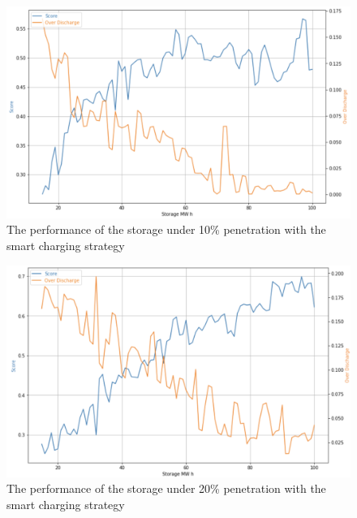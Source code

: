 \documentclass[12pt,a4paper]{report}
\begin{document}
            \begin{figure}[ht]
                \centerline{\includegraphics[scale=0.9]{simu_score_smart_10}}
                \caption{The performance of the storage under 10\% penetration with the smart charging strategy}
                \label{fig_simu_score_smart_10}
            \end{figure}

            \begin{figure}[ht]
                \centerline{\includegraphics[scale=0.9]{simu_score_smart_20}}
                \caption{The performance of the storage under 20\% penetration with the smart charging strategy}
                \label{fig_simu_score_smart_20}
            \end{figure}
\end{document}
